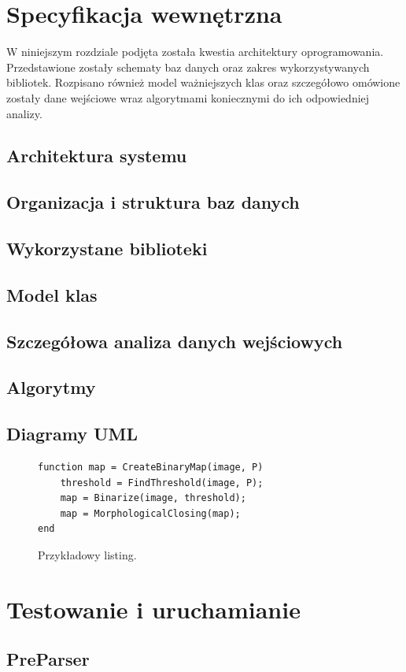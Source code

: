 \documentclass[a4paper]{book}
\begin{document}
\chapter{Specyfikacja wewnętrzna}
W niniejszym rozdziale podjęta została kwestia architektury oprogramowania. Przedstawione zostały schematy baz danych oraz zakres wykorzystywanych bibliotek. Rozpisano również model ważniejszych klas oraz szczegółowo omówione zostały dane wejściowe wraz algorytmami koniecznymi do ich odpowiedniej analizy.
\section{Architektura systemu}
\section{Organizacja i struktura baz danych}
\section{Wykorzystane biblioteki}
\section{Model klas}
\section{Szczegółowa analiza danych wejściowych}
\section{Algorytmy}
\section{Diagramy UML}

\begin{figure}
	\begin{lstlisting}[frame=single]
function map = CreateBinaryMap(image, P)
	threshold = FindThreshold(image, P);
	map = Binarize(image, threshold);
	map = MorphologicalClosing(map);
end
	\end{lstlisting}
	\caption{Przykładowy listing.}
	\label{lst:przyklad}
\end{figure}

\chapter{Testowanie i uruchamianie}
\section {PreParser}
\end{document}
